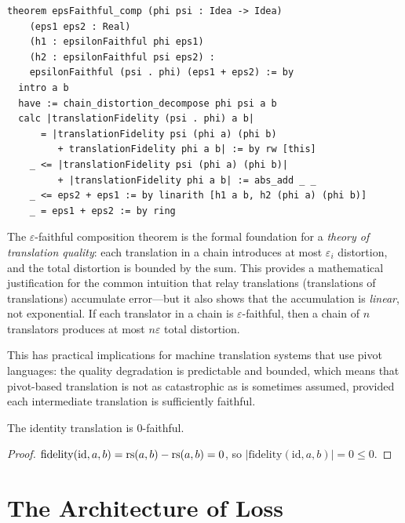 \begin{lstlisting}
theorem epsFaithful_comp (phi psi : Idea -> Idea)
    (eps1 eps2 : Real)
    (h1 : epsilonFaithful phi eps1)
    (h2 : epsilonFaithful psi eps2) :
    epsilonFaithful (psi . phi) (eps1 + eps2) := by
  intro a b
  have := chain_distortion_decompose phi psi a b
  calc |translationFidelity (psi . phi) a b|
      = |translationFidelity psi (phi a) (phi b)
         + translationFidelity phi a b| := by rw [this]
    _ <= |translationFidelity psi (phi a) (phi b)|
         + |translationFidelity phi a b| := abs_add _ _
    _ <= eps2 + eps1 := by linarith [h1 a b, h2 (phi a) (phi b)]
    _ = eps1 + eps2 := by ring
\end{lstlisting}

\begin{interpretation}
\label{int:eps-faithful-practical}
The $\varepsilon$-faithful composition theorem is the formal foundation for
a \emph{theory of translation quality}: each translation in a chain
introduces at most $\varepsilon_i$ distortion, and the total distortion is
bounded by the sum.  This provides a mathematical justification for the
common intuition that relay translations (translations of translations)
accumulate error---but it also shows that the accumulation is \emph{linear},
not exponential.  If each translator in a chain is $\varepsilon$-faithful,
then a chain of $n$ translators produces at most $n\varepsilon$ total
distortion.

This has practical implications for machine translation systems that use
pivot languages: the quality degradation is predictable and bounded, which
means that pivot-based translation is not as catastrophic as is sometimes
assumed, provided each intermediate translation is sufficiently faithful.
\end{interpretation}

\begin{theorem}
\label{thm:id-eps-faithful}
The identity translation is $0$-faithful.
\end{theorem}

\begin{proof}
$\mathrm{fidelity}(\mathrm{id}, a, b) = \mathrm{rs}(a, b) - \mathrm{rs}(a, b) = 0$,
so $|\mathrm{fidelity}(\mathrm{id}, a, b)| = 0 \leq 0$.
\end{proof}

\section{The Architecture of Loss}
\label{sec:untranslatable:loss}

